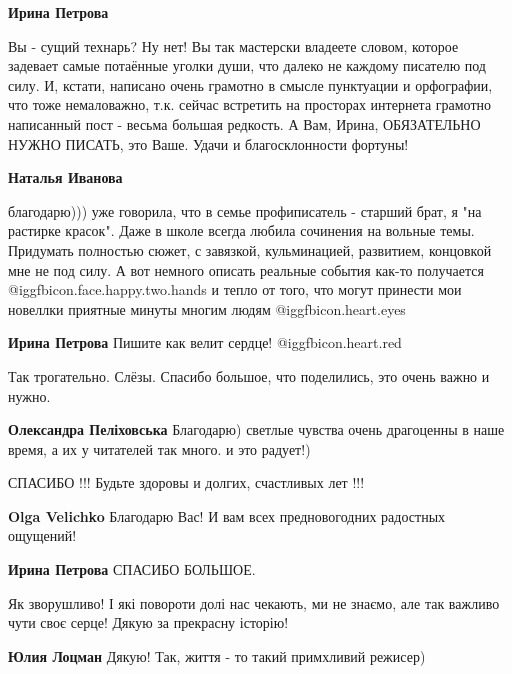 \begin{itemize}
\begin{itemize}
\textbf{Ирина Петрова}

Вы - сущий технарь? Ну нет! Вы так мастерски владеете словом, которое задевает
самые потаённые уголки души, что далеко не каждому писателю под силу. И,
кстати, написано очень грамотно в смысле пунктуации и орфографии, что тоже
немаловажно, т.к. сейчас встретить на просторах интернета грамотно написанный
пост - весьма большая редкость. А Вам, Ирина, ОБЯЗАТЕЛЬНО НУЖНО ПИСАТЬ, это
Ваше. Удачи и благосклонности фортуны!

\textbf{Наталья Иванова} 

благодарю))) уже говорила, что в семье профиписатель - старший брат, я "на
растирке красок". Даже в школе всегда любила сочинения на вольные темы.
Придумать полностью сюжет, с завязкой, кульминацией, развитием, концовкой мне
не под силу. А вот немного описать реальные события как-то получается @igg{fbicon.face.happy.two.hands}  и тепло
от того, что могут принести мои новеллки приятные минуты многим людям @igg{fbicon.heart.eyes} 

\textbf{Ирина Петрова} Пишите как велит сердце! @igg{fbicon.heart.red}

\end{itemize} %


Так трогательно. Слёзы.
Спасибо большое, что поделились, это очень важно и нужно.

\begin{itemize} %
\textbf{Олександра Пеліховська} Благодарю) светлые чувства очень драгоценны в наше время, а их у читателей так много. и это радует!)
\end{itemize} %

СПАСИБО !!! Будьте здоровы и долгих, счастливых лет !!!

\begin{itemize} %
\textbf{Olga Velichko} Благодарю Вас! И вам всех предновогодних радостных ощущений!

\textbf{Ирина Петрова} СПАСИБО БОЛЬШОЕ.
\end{itemize} %

Як зворушливо! І які повороти долі нас чекають, ми не знаємо, але так важливо чути своє серце! Дякую за прекрасну історію!

\textbf{Юлия Лоцман} Дякую! Так, життя - то такий примхливий режисер)


\end{itemize}
